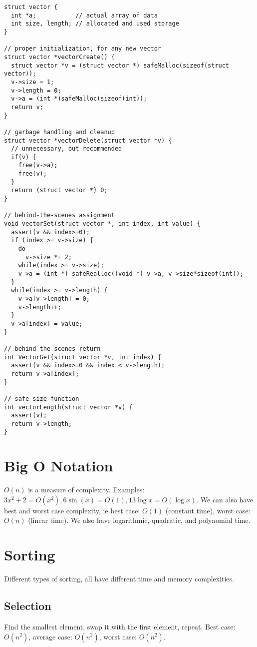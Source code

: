 \documentclass[12pt]{article}
\begin{document}
\begin{verbatim}
struct vector {
  int *a;           // actual array of data
  int size, length; // allocated and used storage
}

// proper initialization, for any new vector
struct vector *vectorCreate() {
  struct vector *v = (struct vector *) safeMalloc(sizeof(struct vector));
  v->size = 1;
  v->length = 0;
  v->a = (int *)safeMalloc(sizeof(int));
  return v;
}

// garbage handling and cleanup
struct vector *vectorDelete(struct vector *v) {
  // unnecessary, but recommended
  if(v) {
    free(v->a);
    free(v);
  }
  return (struct vector *) 0;
}

// behind-the-scenes assignment
void vectorSet(struct vector *, int index, int value) {
  assert(v && index>=0);
  if (index >= v->size) {
    do
      v->size *= 2;
    while(index >= v->size);
    v->a = (int *) safeRealloc((void *) v->a, v->size*sizeof(int));
  }
  while(index >= v->length) {
    v->a[v->length] = 0;
    v->length++;
  }
  v->a[index] = value;
}

// behind-the-scenes return
int VectorGet(struct vector *v, int index) {
  assert(v && index>=0 && index < v->length);
  return v->a[index];
}

// safe size function
int vectorLength(struct vector *v) {
  assert(v);
  return v->length;
}
\end{verbatim}

\section*{Big O Notation}
$O(n)$ is a measure of complexity. Examples: $3x^2 + 2 = O(x^2), 6\sin(x) = O(1), 13\log x = O(\log x)$. We can also have best and worst case complexity, ie best case: $O(1)$ (constant time), worst case: $O(n)$ (linear time). We also have logarithmic, quadratic, and polynomial time.

\section*{Sorting}
Different types of sorting, all have different time and memory complexities.

\subsection*{Selection}
Find the smallest element, swap it with the first element, repeat. Best case: $O(n^2)$, average case: $O(n^2)$, worst case: $O(n^2)$.
\end{document}
